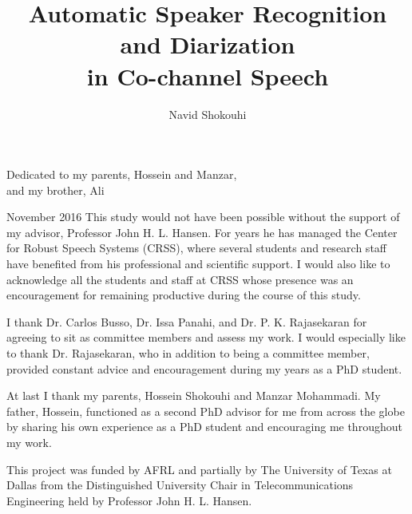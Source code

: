 \documentclass[doublespacing]{utdthesis}
\author{Navid Shokouhi}
\title{Automatic Speaker Recognition and Diarization \\
	in Co-channel Speech}
\begin{document}
\frontmatter

\signaturepage
{} %

\begin{dedication} %
Dedicated to my parents, Hossein and Manzar, \\ 
and my brother, Ali \\
\end{dedication}

\maketitle

\begin{acks}{November 2016} %
	This study would not have been possible without the support of my advisor, Professor John H. L. Hansen. 
	For years he has managed the Center for Robust Speech Systems (CRSS), where several students and research staff have benefited from his professional and scientific support. 
	I would also like to acknowledge all the students and staff at CRSS whose presence was an encouragement for remaining productive during the course of this study. 
	
	I thank Dr. Carlos Busso, Dr. Issa Panahi, and Dr. P. K. Rajasekaran for agreeing to sit as committee members and assess my work. 
	I would especially like to thank Dr. Rajasekaran, who in addition to being a committee member, provided constant advice and encouragement during my years as a PhD student. 
	
	At last I thank my parents, Hossein Shokouhi and Manzar Mohammadi. 
	My father, Hossein, functioned as a second PhD advisor for me from across the globe by sharing his own experience as a PhD student and encouraging me throughout my work. 
	
	This project was funded by AFRL and partially by The University of Texas at Dallas from the Distinguished University Chair in Telecommunications Engineering held by Professor John H. L. Hansen.

\end{acks}
\end{document}
